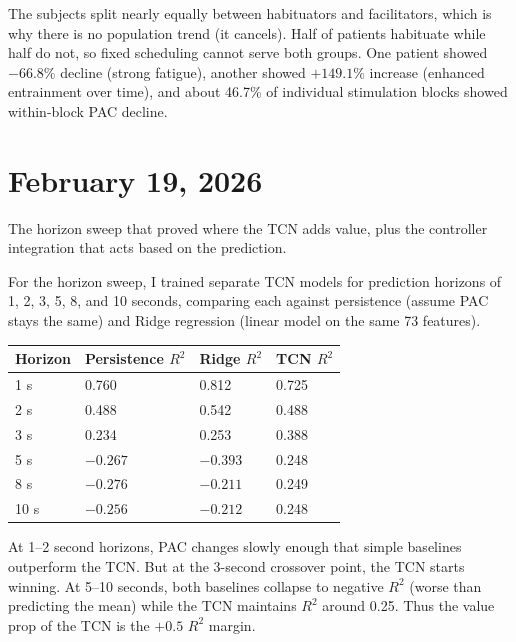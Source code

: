 \documentclass[11pt,letterpaper]{article}
\begin{document}
The subjects split nearly equally between habituators and facilitators, which is why there is
no population trend (it cancels). Half of patients habituate while half do not, so fixed
scheduling cannot serve both groups. One patient showed $-66.8\%$ decline (strong fatigue),
another showed $+149.1\%$ increase (enhanced entrainment over time), and about 46.7\% of
individual stimulation blocks showed within-block PAC decline.

\section*{February 19, 2026}

The horizon sweep that proved where the TCN adds value, plus the controller integration that
acts based on the prediction.

For the horizon sweep, I trained separate TCN models for prediction horizons of 1, 2, 3, 5, 8,
and 10 seconds, comparing each against persistence (assume PAC stays the same) and Ridge
regression (linear model on the same 73 features).

\vspace{0.5em}
\begin{tabular}{@{}llll@{}}
\toprule
\textbf{Horizon} & \textbf{Persistence $R^2$} & \textbf{Ridge $R^2$} & \textbf{TCN $R^2$} \\
\midrule
1 s  & 0.760  & 0.812  & 0.725 \\
2 s  & 0.488  & 0.542  & 0.488 \\
3 s  & 0.234  & 0.253  & 0.388 \\
5 s  & $-0.267$ & $-0.393$ & 0.248 \\
8 s  & $-0.276$ & $-0.211$ & 0.249 \\
10 s & $-0.256$ & $-0.212$ & 0.248 \\
\bottomrule
\end{tabular}
\vspace{0.5em}

At 1--2 second horizons, PAC changes slowly enough that simple baselines outperform the TCN.
But at the 3-second crossover point, the TCN starts winning. At 5--10 seconds, both baselines
collapse to negative $R^2$ (worse than predicting the mean) while the TCN maintains $R^2$
around 0.25. Thus the value prop of the TCN is the $+0.5$ $R^2$ margin.
\end{document}
